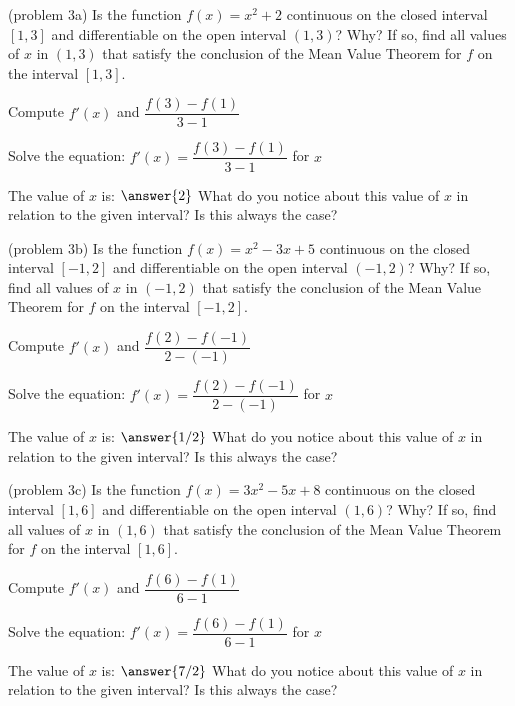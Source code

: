 \documentclass[handout]{ximera}
\begin{document}
\begin{problem}(problem 3a)
  Is the function $f(x) = x^2 + 2$ continuous on the closed interval $[1,3]$ and differentiable on the open interval $(1,3)$? Why?
  If so, find all values of $x$ in $(1,3)$ that satisfy the conclusion of the Mean Value Theorem for $f$ on the interval $[1,3]$.
	
    \begin{hint}
      Compute $f'(x)$ and $\dfrac{f(3) - f(1)}{3-1}$
    \end{hint}
		\begin{hint}
		  Solve the equation: $f'(x) = \dfrac{f(3) - f(1)}{3-1}$ for $x$
		\end{hint}
		
		The value of $x$ is:
		 $\answer{2}$
     What do you notice about this value of $x$ in relation to the given interval? Is this always the case?
\end{problem}

\begin{problem}(problem 3b)
  Is the function $f(x) = x^2 -3x + 5$ continuous on the closed interval $[-1,2]$ and differentiable on the open interval $(-1,2)$? Why?
  If so, find all values of $x$ in $(-1,2)$ that satisfy the conclusion of the Mean Value Theorem for $f$ on the interval $[-1,2]$.
	
    \begin{hint}
      Compute $f'(x)$ and $\dfrac{f(2) - f(-1)}{2-(-1)}$
    \end{hint}
		\begin{hint}
		  Solve the equation: $f'(x) = \dfrac{f(2) - f(-1)}{2-(-1)}$ for $x$
		\end{hint}
		
		The value of $x$ is:
		 $\answer{1/2}$
 What do you notice about this value of $x$ in relation to the given interval? Is this always the case?
\end{problem}

\begin{problem}(problem 3c)
  Is the function $f(x) = 3x^2 -5x + 8$ continuous on the closed interval $[1,6]$ and differentiable on the open interval $(1,6)$? Why?
  If so, find all values of $x$ in $(1,6)$ that satisfy the conclusion of the Mean Value Theorem for $f$ on the interval $[1,6]$.
	
    \begin{hint}
      Compute $f'(x)$ and $\dfrac{f(6) - f(1)}{6-1}$
    \end{hint}
		\begin{hint}
		  Solve the equation: $f'(x) = \dfrac{f(6) - f(1)}{6-1}$ for $x$
		\end{hint}
		
		The value of $x$ is:
		 $\answer{7/2}$
     What do you notice about this value of $x$ in relation to the given interval? Is this always the case?
\end{problem}
\end{document}
